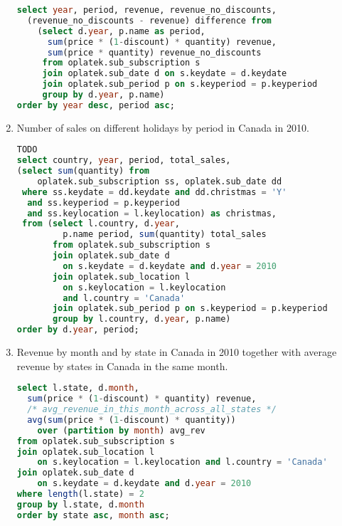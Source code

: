 \begin{enumerate}
\begin{lstlisting}[language=sql]
select year, period, revenue, revenue_no_discounts, 
  (revenue_no_discounts - revenue) difference from 
    (select d.year, p.name as period, 
      sum(price * (1-discount) * quantity) revenue, 
      sum(price * quantity) revenue_no_discounts
     from oplatek.sub_subscription s 
     join oplatek.sub_date d on s.keydate = d.keydate
     join oplatek.sub_period p on s.keyperiod = p.keyperiod
     group by d.year, p.name)
order by year desc, period asc;
\end{lstlisting}
  \item Number of sales on different holidays by period in Canada in 2010.
\begin{lstlisting}[language=sql] 
TODO
select country, year, period, total_sales, 
(select sum(quantity) from 
    oplatek.sub_subscription ss, oplatek.sub_date dd 
 where ss.keydate = dd.keydate and dd.christmas = 'Y' 
  and ss.keyperiod = p.keyperiod 
  and ss.keylocation = l.keylocation) as christmas,
 from (select l.country, d.year, 
         p.name period, sum(quantity) total_sales
       from oplatek.sub_subscription s 
       join oplatek.sub_date d 
         on s.keydate = d.keydate and d.year = 2010
       join oplatek.sub_location l 
         on s.keylocation = l.keylocation 
         and l.country = 'Canada'
       join oplatek.sub_period p on s.keyperiod = p.keyperiod 
       group by l.country, d.year, p.name)
order by d.year, period;
\end{lstlisting}
  \item Revenue by month and by state in Canada in 2010 together with average revenue by states in Canada in the same month.
\begin{lstlisting}[language=sql] 
select l.state, d.month, 
  sum(price * (1-discount) * quantity) revenue,
  /* avg_revenue_in_this_month_across_all_states */
  avg(sum(price * (1-discount) * quantity)) 
    over (partition by month) avg_rev 
from oplatek.sub_subscription s 
join oplatek.sub_location l 
    on s.keylocation = l.keylocation and l.country = 'Canada' 
join oplatek.sub_date d 
    on s.keydate = d.keydate and d.year = 2010
where length(l.state) = 2
group by l.state, d.month
order by state asc, month asc;
\end{lstlisting}
\end{enumerate}

